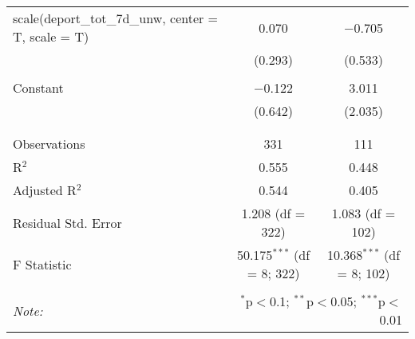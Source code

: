 \begin{table}[!htbp]
\begin{tabular}{@{\extracolsep{5pt}}lcc}
 scale(deport\_tot\_7d\_unw, center = T, scale = T) & 0.070 & $-$0.705 \\ 
  & (0.293) & (0.533) \\ 
  & & \\ 
 Constant & $-$0.122 & 3.011 \\ 
  & (0.642) & (2.035) \\ 
  & & \\ 
\hline \\[-1.8ex] 
Observations & 331 & 111 \\ 
R$^{2}$ & 0.555 & 0.448 \\ 
Adjusted R$^{2}$ & 0.544 & 0.405 \\ 
Residual Std. Error & 1.208 (df = 322) & 1.083 (df = 102) \\ 
F Statistic & 50.175$^{***}$ (df = 8; 322) & 10.368$^{***}$ (df = 8; 102) \\ 
\hline 
\hline \\[-1.8ex] 
\textit{Note:}  & \multicolumn{2}{r}{$^{*}$p$<$0.1; $^{**}$p$<$0.05; $^{***}$p$<$0.01} \\ 
\end{tabular} 
\end{table} 
